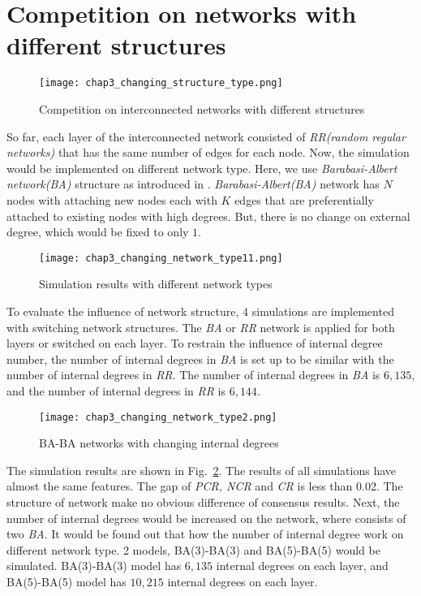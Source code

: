 \section{Competition on networks with different structures}
\begin{figure}[!htb]
	\centering
	\texttt{[image: chap3\_changing\_structure\_type.png]}
	\caption{Competition on interconnected networks with different structures}
	\label{chap3_changing_structure_type}
\end{figure}

So far, each layer of the interconnected network consisted of \textit{RR(random regular networks)} that has the same number of edges for each node. Now, the simulation would be implemented on different network type. Here, we use \textit{Barabasi-Albert network(BA)} structure as introduced in \parencite{barabasi1999}. \textit{Barabasi-Albert(BA)} network has $N$ nodes with attaching new nodes each with $K$ edges that are preferentially attached to existing nodes with high degrees. But, there is no change on external degree, which would be fixed to only $1$.
\begin{figure}[!htb]
	\centering
	\texttt{[image: chap3\_changing\_network\_type11.png]}
	\caption{Simulation results with different network types}
	\label{chap3_changing_network_type1}
\end{figure}

To evaluate the influence of network structure, 4 simulations are implemented with switching network structures. The \textit{BA} or \textit{RR} network is applied for both layers or switched on each layer. To restrain the influence of internal degree number, the number of internal degrees in \textit{BA} is set up to be similar with the number of internal degrees in \textit{RR}. The number of internal degrees in \textit{BA} is $6,135$, and the number of internal degrees in \textit{RR} is $6,144$. 
\begin{figure}[!htb]
	\centering
	\texttt{[image: chap3\_changing\_network\_type2.png]}
	\caption{BA-BA networks with changing internal degrees}
	\label{chap3_changing_network_type2}
\end{figure}
The simulation results are shown in Fig.~\ref{chap3_changing_network_type1}. The results of all simulations have almost the same features. The gap of \textit{PCR, NCR} and \textit{CR} is less than 0.02. The structure of network make no obvious difference of consensus results. Next, the number of internal degrees would be increased on the network, where consists of two \textit{BA}. It would be found out that how the number of internal degree work on different network type. 2 models, BA(3)-BA(3) and BA(5)-BA(5) would be simulated. BA(3)-BA(3) model has $6,135$ internal degrees on each layer, and BA(5)-BA(5) model has $10,215$ internal degrees on each layer. 


